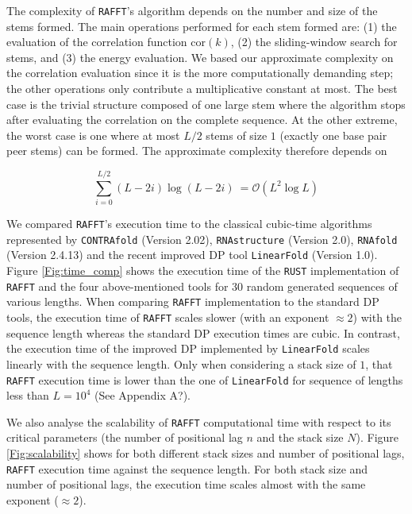 The complexity of \texttt{RAFFT}'s algorithm depends on the number and size of the stems formed. The main operations performed for each stem formed are: (1) the evaluation of the correlation function \(\text{cor}(k)\), (2) the sliding-window search for stems, and (3) the energy evaluation. We based our approximate complexity on the correlation evaluation since it is the more computationally demanding step; the other operations only contribute a multiplicative constant at most. The best case is the trivial structure composed of one large stem where the algorithm stops after evaluating the correlation on the complete sequence. At the other extreme, the worst case is one where at most \(L/2\) stems of size $1$ (exactly one base pair peer stems) can be formed. The approximate complexity therefore depends on 

\begin{equation}
	\label{Eq:complexity}
	\sum_{i=0}^{L/2} (L-2i) \log(L-2i) \ = \mathcal{O}(L^2\log{L})
\end{equation}

We compared \texttt{RAFFT}'s execution time to the classical cubic-time algorithms represented by \texttt{CONTRAfold} (Version 2.02), \texttt{RNAstructure} (Version 2.0), \texttt{RNAfold} (Version 2.4.13) and the recent improved DP tool \texttt{LinearFold} (Version 1.0). Figure \ref{Fig:time_comp} shows the execution time of the \texttt{RUST} implementation of \texttt{RAFFT} and the four above-mentioned tools for $30$ random generated sequences of various lengths.  When comparing \texttt{RAFFT} implementation to the standard DP tools, the execution time of \texttt{RAFFT} scales slower (with an exponent $\approx 2$) with the sequence length whereas the standard DP execution times are cubic. In contrast, the execution time of the improved DP implemented by \texttt{LinearFold} scales linearly with the sequence length. Only when considering a stack size of $1$, that \texttt{RAFFT} execution time is lower than the one of \texttt{LinearFold} for sequence of lengths less than $L=10^4$ (See Appendix A?).

We also analyse the scalability of \texttt{RAFFT} computational time with respect to its critical parameters (the number  of positional lag $n$ and the stack size $N$).  Figure \ref{Fig:scalability} shows for both different stack sizes and number of positional lags, \texttt{RAFFT} execution time against the sequence length. For both stack size and number of positional lags, the execution time scales almost with the same exponent ($\approx 2$).

